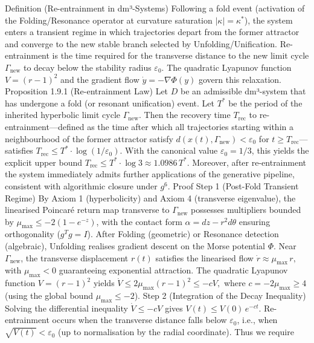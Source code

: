 Definition (Re-entrainment in dm³-Systems)
Following a fold event (activation of the Folding/Resonance operator at curvature saturation $  |\kappa| = \kappa^*  $), the system enters a transient regime in which trajectories depart from the former attractor and converge to the new stable branch selected by Unfolding/Unification. Re-entrainment is the time required for the transverse distance to the new limit cycle $  \Gamma_{\text{new}}  $ to decay below the stability radius $  \varepsilon_0  $. The quadratic Lyapunov function $  V = (r-1)^2  $ and the gradient flow $  \dot{y} = -\nabla \Phi(y)  $ govern this relaxation.
Proposition 1.9.1 (Re-entrainment Law)
Let $  D  $ be an admissible dm³-system that has undergone a fold (or resonant unification) event. Let $  T^*  $ be the period of the inherited hyperbolic limit cycle $  \Gamma_{\text{new}}  $. Then the recovery time $  T_{\text{rec}}  $ to re-entrainment—defined as the time after which all trajectories starting within a neighbourhood of the former attractor satisfy $  d(x(t), \Gamma_{\text{new}}) < \varepsilon_0  $ for $  t \ge T_{\text{rec}}  $—satisfies
$   T_{\text{rec}} \le T^* \cdot \log(1/\varepsilon_0).   $
With the canonical value $  \varepsilon_0 = 1/3  $, this yields the explicit upper bound $  T_{\text{rec}} \le T^* \cdot \log 3 \approx 1.0986 \, T^*  $. Moreover, after re-entrainment the system immediately admits further applications of the generative pipeline, consistent with algorithmic closure under $  g^6  $.
Proof
Step 1 (Post-Fold Transient Regime)
By Axiom 1 (hyperbolicity) and Axiom 4 (transverse eigenvalue), the linearised Poincaré return map transverse to $  \Gamma_{\text{new}}  $ possesses multipliers bounded by $  \mu_{\max} \le -2(1 - e^{-z})  $, with the contact form $  \alpha = dz - r^2 d\theta  $ ensuring orthogonality ($  g^T g = I  $). After Folding (geometric) or Resonance detection (algebraic), Unfolding realises gradient descent on the Morse potential $  \Phi  $. Near $  \Gamma_{\text{new}}  $, the transverse displacement $  r(t)  $ satisfies the linearised flow
$   \dot{r} \approx \mu_{\max} \, r,   $
with $  \mu_{\max} < 0  $ guaranteeing exponential attraction. The quadratic Lyapunov function $  V = (r-1)^2  $ yields
$   \dot{V} \le 2 \mu_{\max} (r-1)^2 \le -c V,   $
where $  c = -2\mu_{\max} \ge 4  $ (using the global bound $  \mu_{\max} \le -2  $).
Step 2 (Integration of the Decay Inequality)
Solving the differential inequality $  \dot{V} \le -c V  $ gives
$   V(t) \le V(0) \, e^{-c t}.   $
Re-entrainment occurs when the transverse distance falls below $  \varepsilon_0  $, i.e., when $  \sqrt{V(t)} < \varepsilon_0  $ (up to normalisation by the radial coordinate). Thus we require
